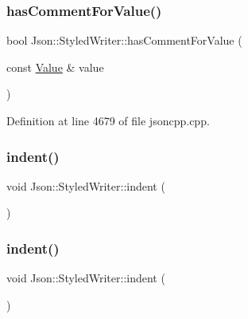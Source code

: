 \hypertarget{class_json_1_1_styled_writer_a37a806d010f708cb68556f2666f79bdf}{}\label{class_json_1_1_styled_writer_a37a806d010f708cb68556f2666f79bdf} 
\subsubsection{\texorpdfstring{has\+Comment\+For\+Value()}{hasCommentForValue()}\hspace{0.1cm}{\footnotesize\ttfamily [2/2]}}
{\footnotesize\ttfamily bool Json\+::\+Styled\+Writer\+::has\+Comment\+For\+Value (\begin{DoxyParamCaption}\item[{const \hyperlink{class_json_1_1_value}{Value} \&}]{value }\end{DoxyParamCaption})\hspace{0.3cm}{\ttfamily [private]}}



Definition at line 4679 of file jsoncpp.\+cpp.

\hypertarget{class_json_1_1_styled_writer_a0b65be6186a7c6638270990265e42b97}{}\label{class_json_1_1_styled_writer_a0b65be6186a7c6638270990265e42b97} 
\subsubsection{\texorpdfstring{indent()}{indent()}\hspace{0.1cm}{\footnotesize\ttfamily [1/2]}}
{\footnotesize\ttfamily void Json\+::\+Styled\+Writer\+::indent (\begin{DoxyParamCaption}{ }\end{DoxyParamCaption})\hspace{0.3cm}{\ttfamily [private]}}

\hypertarget{class_json_1_1_styled_writer_a0b65be6186a7c6638270990265e42b97}{}\label{class_json_1_1_styled_writer_a0b65be6186a7c6638270990265e42b97} 
\subsubsection{\texorpdfstring{indent()}{indent()}\hspace{0.1cm}{\footnotesize\ttfamily [2/2]}}
{\footnotesize\ttfamily void Json\+::\+Styled\+Writer\+::indent (\begin{DoxyParamCaption}{ }\end{DoxyParamCaption})\hspace{0.3cm}{\ttfamily [private]}}



